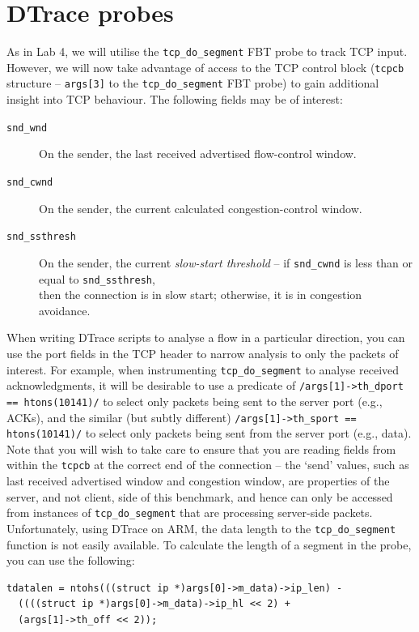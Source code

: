 \documentclass[a4paper,10pt]{article}
\begin{document}
\section*{DTrace probes}

As in Lab 4, we will utilise the \texttt{tcp\_do\_segment} FBT probe to track
TCP input.
However, we will now take advantage of access to the TCP control block
(\texttt{tcpcb} structure -- \texttt{args[3]} to the \texttt{tcp\_do\_segment}
FBT probe) to gain additional insight into TCP behaviour.
The following fields may be of interest:

\begin{description}
\item[\texttt{snd\_wnd}] On the sender, the last received advertised
  flow-control window.
\item[\texttt{snd\_cwnd}] On the sender, the current calculated
  congestion-control window.
\item[\texttt{snd\_ssthresh}] On the sender, the current \textit{slow-start
  threshold} -- if \texttt{snd\_cwnd} is less than or equal to
  \texttt{snd\_ssthresh}, \\
  then the connection is in slow start; otherwise, it is in congestion
  avoidance.
\end{description}

When writing DTrace scripts to analyse a flow in a particular direction, you
can use the port fields in the TCP header to narrow analysis to only the
packets of interest.
For example, when instrumenting \texttt{tcp\_do\_segment} to analyse received
acknowledgments, it will be desirable to use a predicate of
\texttt{/args[1]->th\_dport == htons(10141)/} to select only packets being
sent to the server port (e.g., ACKs), and the similar (but subtly different)
\texttt{/args[1]->th\_sport == htons(10141)/} to select only packets being
sent from the server port (e.g., data).
Note that you will wish to take care to ensure that you are reading fields
from within the \texttt{tcpcb} at the correct end of the connection -- the
`send' values, such as last received advertised window and congestion window,
are properties of the server, and not client, side of this benchmark, and
hence can only be accessed from instances of \texttt{tcp\_do\_segment} that
are processing server-side packets.
Unfortunately, using DTrace on ARM, the data length to the \texttt{tcp\_do\_segment} function is not easily available.
To calculate the length of a segment in the probe, you can use the following:

\begin{verbatim}
tdatalen = ntohs(((struct ip *)args[0]->m_data)->ip_len) -
  ((((struct ip *)args[0]->m_data)->ip_hl << 2) +
  (args[1]->th_off << 2));
\end{verbatim}
\end{document}
